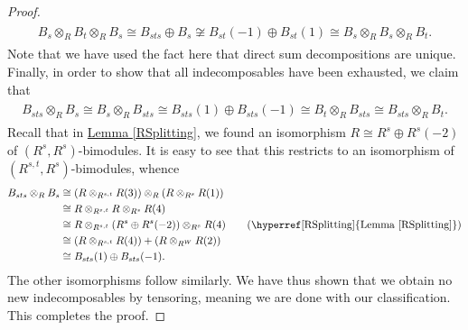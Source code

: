 \begin{proof}
\begin{align*}
\begin{split}
B_s \otimes_R B_t \otimes_R B_s \cong B_{sts} \oplus B_s \not\cong B_{st}(-1) \oplus B_{st}(1) \cong B_s \otimes_R B_s \otimes_R B_t.
\end{split}
\end{align*}
\noindent Note that we have used the fact here that direct sum decompositions are unique. Finally, in order to show that all indecomposables have been exhausted, we claim that
\begin{align*}
\begin{split}
B_{sts} \otimes_R B_s \cong B_s \otimes_R B_{sts} \cong B_{sts}(1) \oplus B_{sts}(-1) \cong B_t \otimes_R B_{sts} \cong B_{sts} \otimes_R B_t.
\end{split}
\end{align*}
\noindent Recall that in \hyperref[RSplitting]{Lemma \ref*{RSplitting}}, we found an isomorphism $R \cong R^s \oplus R^s(-2)$ of $(R^s, R^s)$-bimodules. It is easy to see that this restricts to an isomorphism of $(R^{s,t}, R^s)$-bimodules, whence
\begin{align*}
B_{sts} \otimes_R B_s &\cong (R \otimes_{R^{s,t}} R(3)) \otimes_R (R \otimes_{R^s} R(1))\\
&\cong R \otimes_{R^{s,t}} R \otimes_{R^s} R(4)\\
&\cong R \otimes_{R^{s,t}} (R^s \oplus R^s(-2)) \otimes_{R^s} R(4) \tag*{(\hyperref[RSplitting]{Lemma \ref*{RSplitting}})}\\
&\cong (R \otimes_{R^{s,t}} R(4)) + (R \otimes_{R^W} R(2))\\
&\cong B_{sts}(1) \oplus B_{sts}(-1).
\end{align*}
\noindent The other isomorphisms follow similarly. We have thus shown that we obtain no new indecomposables by tensoring, meaning we are done with our classification. This completes the proof.
\end{proof}\\

